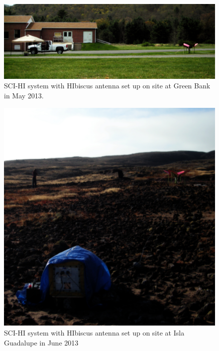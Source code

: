 \begin{figure}[htb]
\begin{center}

\includegraphics[width=0.95\linewidth]{SCIHI_system/figures/SCIHI_gbt_sys.jpg}
\caption{SCI-HI system with HIbiscus antenna set up on site at Green Bank in May 2013.}
\label{Fig:sys_gbt}

\end{center}
\end{figure}


\begin{figure}[htb]
\begin{center}
\includegraphics[width=0.85\linewidth]{SCIHI_system/figures/SCIHI_guad_sys.jpg}
\caption{SCI-HI system with HIbiscus antenna set up on site at Isla Guadalupe in June 2013}
\label{Fig:sys_guad}

\end{center}
\end{figure}



